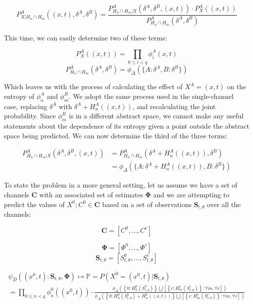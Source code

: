 \documentclass[10pt]{article}
\begin{document}
\begin{equation}
P_{X|H_n \cap H_m}^A \left( (x,t), \delta^A, \delta^B \right) =
\frac 
{ P_{H_n \cap H_m | X}^A \left( \delta^A, \delta^B,(x,t) \right) \cdot P_X^A \left( (x,t) \right) }
{ P_{H_n \cap H_m}^A \left( \delta^A, \delta^B \right) }
\end{equation}

This time, we can easily determine two of these terms:

\begin{equation} P_X^A \left( (x,t) \right) = \prod_{0 \le i < q} \phi_i^A(x,t) \end{equation}
\begin{equation} P_{H_n \cap H_m}^A \left( \delta^A, \delta^B \right) = \phi_\Delta \left( \{ A: \delta^A, B: \delta^B \} \right) \end{equation}

Which leaves us with the process of calculating the effect of \(X^A = (x,t) \) on the entropy of \(\phi_n^A \) and \(\phi_m^B \).  We adopt the same process used in the single-channel case, replacing \(\delta^A \) with \(\delta^A + H_n^A((x,t)) \), and recalculating the joint probability. Since \(\phi_m^B \) is in a different abstract space, we cannot make any useful statements about the dependence of its entropy given a point outside the abstract space being predicted.  We can now determine the third of the three terms:

\begin{align}
P_{H_n \cap H_m | X}^A \left( \delta^A, \delta^B, (x,t) \right) &= P_{H_n \cap H_m}^A \left( \delta^A + H_n^A((x,t)), \delta^B \right) \nonumber \\
&= \phi_\Delta \left( \{ A:\delta^A + H_n^A((x,t)), B: \delta^B \} \right)
\end{align}

To state the problem in a more general setting, let us assume we have a set of channels \(\mathbf{C} \) with an associated set of estimates \(\mathbf{\Phi} \) and we are attempting to predict the values of \(X^0; C^0 \in \mathbf{C} \) based on a set of observations \(\mathbf{S}_{t,\theta} \) over all the channels:


\[ \mathbf{C} = [C^0,...,C^c] \nonumber \]

\[ \mathbf{\Phi} = [\Phi^0,...,\Phi^c] \nonumber \]
\[ \mathbf{S}_{t,\theta} = [ S_{t,\theta}^0,...,S_{t,\theta}^c] \nonumber \]

\begin{multline} \psi_D \left( (x^0,t):\mathbf{S}_{t,\theta},\mathbf{\Phi} \right) \mapsto \mathbb{P} = P \left( X^0 = (x^0,t) | \mathbf{S}_{t,\theta} \right) \\
= \prod_{0 \le n < q} \phi_n^0 \left( (x^0,t) \right) \cdot \frac
{ \phi_\Delta \left( \left \{ 0: H_n^0(S_{t,\theta}^0) \right \} \bigcup \left[ \left \{ c: H_m^c(S_{t,\theta}^c) \right \} : \forall m, \forall c \right] \right) }
{ \phi_\Delta \left( \left \{ 0: H_n^0(S_{t,\theta}^0) + H_n^0 \left( (x,t) \right) \right \} \bigcup \left[ \left \{ c: H_m^c(S_{t,\theta}^c) \right \} : \forall m, \forall c \right] \right) }
\end{multline}
\end{document}

